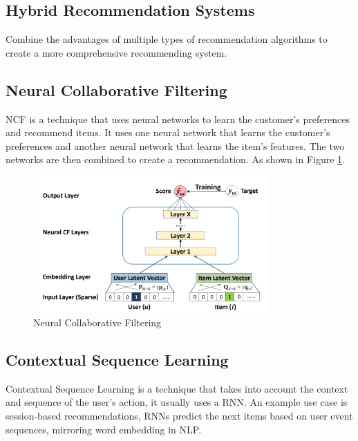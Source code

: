 \subsection{Hybrid Recommendation Systems}
Combine the advantages of multiple types of recommendation algorithms to create a more comprehensive recommending system.
\subsection{Neural Collaborative Filtering}
NCF is a technique that uses neural networks to learn the customer's preferences and recommend items. It uses one neural network that learns the customer's preferences and another neural network that learns the item's features. The two networks are then combined to create a recommendation. As shown in Figure \ref{fig:neural-collaborative-filtering}.
\begin{figure}[H]
    \centering
    \includegraphics[width=0.8\textwidth]{assets/neural-collaborative-filtering.png}
    \caption[Neural Collaborative Filtering]{Neural Collaborative Filtering~\cite{NvidiaRecSys}}
    \label{fig:neural-collaborative-filtering}
\end{figure}

\subsection{Contextual Sequence Learning}
Contextual Sequence Learning is a technique that takes into account the context and sequence of the user's action, it usually uses a RNN.
An example use case is session-based recommendations, RNNs predict the next items based on user event sequences, mirroring word embedding in NLP.
